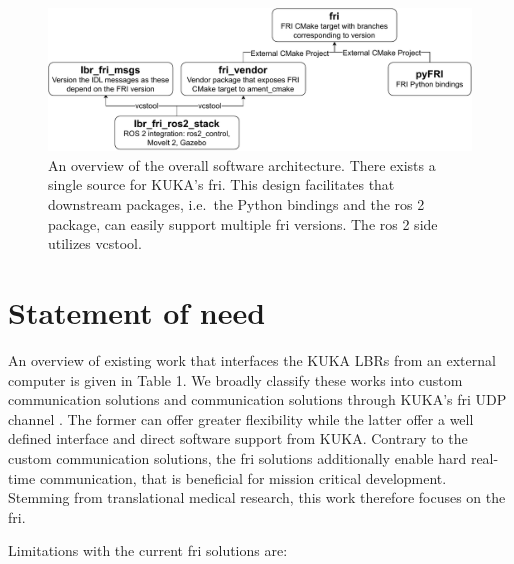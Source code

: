 \begin{figure}
\centering
\includegraphics[width=\textwidth]{appendix_a/img/fri_dependency_architecture.pdf}
\caption[An overview of the overall software architecture. There exists
a single source for KUKA's \gls{fri}. This design facilitates that downstream
packages, i.e.~the Python bindings and the \gls{ros} 2 package, can easily
support multiple \gls{fri} versions. The \gls{ros} 2 side utilizes
vcstool.\label{fig:fri}]{An overview of the overall software
architecture. There exists a single source for KUKA's \gls{fri}. This design
facilitates that downstream packages, i.e.~the Python bindings and the
\gls{ros} 2 package, can easily support multiple \gls{fri} versions. The \gls{ros} 2 side
utilizes vcstool\footnotemark{}.\label{fig:fri}}
\end{figure}

\hypertarget{statement-of-need}{%
\section{Statement of need}\label{statement-of-need}}

An overview of existing work that interfaces the KUKA LBRs from an
external computer is given in Table 1. We broadly classify these works
into custom communication solutions
\cite{ref-iiwa_stack,ref-kuka_sunrise_toolbox,ref-libiiwa} and
communication solutions through KUKA's \gls{fri} UDP channel 
\cite{ref-iiwa_ros2,ref-iiwa_ros}. The
former can offer greater flexibility while the latter offer a well
defined interface and direct software support from KUKA. Contrary to the
custom communication solutions, the \gls{fri} solutions additionally enable
hard real-time communication, that is beneficial for mission critical
development. Stemming from translational medical research, this work
therefore focuses on the \gls{fri}.

Limitations with the current \gls{fri} solutions are:

